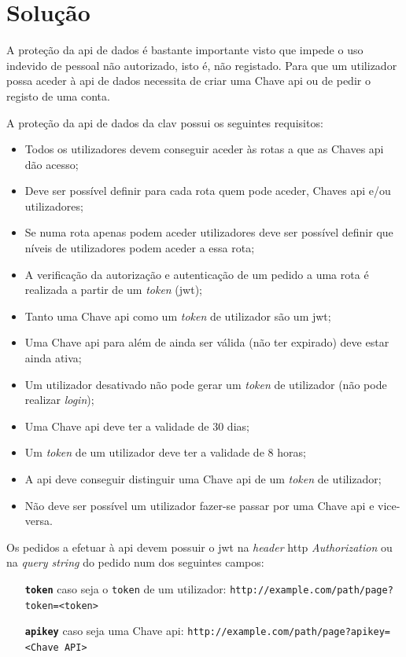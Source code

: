 \section{Solução}

A proteção da \acrshort{api} de dados é bastante importante visto que impede o uso indevido de pessoal não 
autorizado, isto é, não registado. Para que um utilizador possa aceder à \acrshort{api} de dados necessita de 
criar uma Chave \acrshort{api} ou de pedir o registo de uma conta. 

A proteção da \acrshort{api} de dados da \acrshort{clav} possui os seguintes requisitos:
\begin{itemize}
    \item Todos os utilizadores devem conseguir aceder às rotas a que as Chaves \acrshort{api} dão acesso;
    \item Deve ser possível definir para cada rota quem pode aceder, Chaves \acrshort{api} e/ou utilizadores;
    \item Se numa rota apenas podem aceder utilizadores deve ser possível definir que níveis de utilizadores 
    podem aceder a essa rota;
    \item A verificação da autorização e autenticação de um pedido a uma rota é realizada a partir de um 
    \textit{token} (\acrshort{jwt});
    \item Tanto uma Chave \acrshort{api} como um \textit{token} de utilizador são um \acrshort{jwt};
    \item Uma Chave \acrshort{api} para além de ainda ser válida (não ter expirado) deve estar ainda ativa;
    \item Um utilizador desativado não pode gerar um \textit{token} de utilizador (não pode realizar 
    \textit{login});
    \item Uma Chave \acrshort{api} deve ter a validade de 30 dias;
    \item Um \textit{token} de um utilizador deve ter a validade de 8 horas;
    \item A \acrshort{api} deve conseguir distinguir uma Chave \acrshort{api} de um \textit{token} de utilizador;
    \item Não deve ser possível um utilizador fazer-se passar por uma Chave \acrshort{api} e vice-versa.
\end{itemize}

Os pedidos a efetuar à \acrshort{api} devem possuir o \acrshort{jwt} na \textit{header} 
\acrshort{http} \textit{Authorization} ou na \textit{query string} do pedido num dos seguintes campos:
\begin{itemize}[leftmargin=3cm]
    \item[\textbf{\texttt{token}}] caso seja o \texttt{token} de um utilizador:\newline
        \verb|http://example.com/path/page?token=<token>|
    \item[\textbf{\texttt{apikey}}] caso seja uma Chave \acrshort{api}:\newline
        \verb|http://example.com/path/page?apikey=<Chave API>|
\end{itemize}

